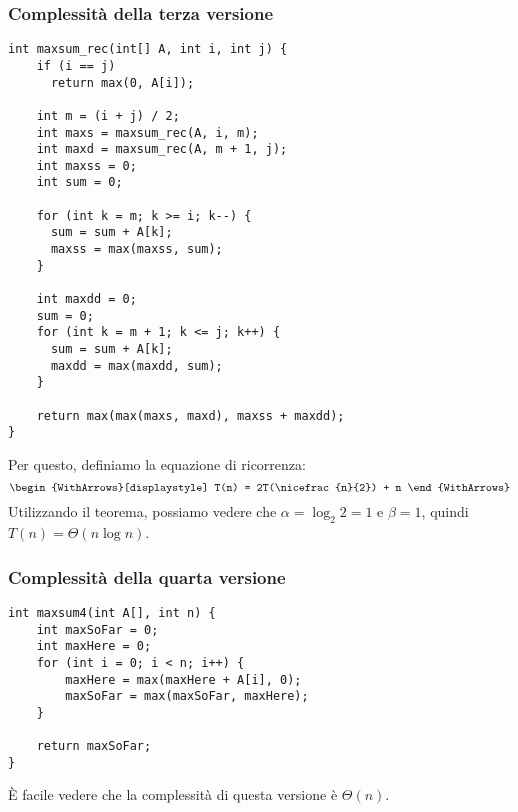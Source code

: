 \subsubsection*{Complessità della terza versione}

\begin{code}
\begin{verbatim}
int maxsum_rec(int[] A, int i, int j) {
    if (i == j)
      return max(0, A[i]);

    int m = (i + j) / 2;
    int maxs = maxsum_rec(A, i, m);
    int maxd = maxsum_rec(A, m + 1, j);
    int maxss = 0;
    int sum = 0;

    for (int k = m; k >= i; k--) {
      sum = sum + A[k];
      maxss = max(maxss, sum);
    }

	int maxdd = 0;
    sum = 0;
    for (int k = m + 1; k <= j; k++) {
      sum = sum + A[k];
      maxdd = max(maxdd, sum);
    }

    return max(max(maxs, maxd), maxss + maxdd);
}
\end{verbatim}
\end{code}

Per questo, definiamo la equazione di ricorrenza:
\[\begin{WithArrows}[displaystyle]
T(n) = 2T(\nicefrac{n}{2}) + n
\end{WithArrows}\]
Utilizzando il teorema, possiamo vedere che \(\alpha = \log_2 2 = 1\) e \(\beta = 1\), quindi \(T(n) = \Theta(n \log n)\).

\subsubsection*{Complessità della quarta versione}

\begin{code}
\begin{verbatim}
int maxsum4(int A[], int n) {
	int maxSoFar = 0;
	int maxHere = 0;
	for (int i = 0; i < n; i++) {
		maxHere = max(maxHere + A[i], 0);
		maxSoFar = max(maxSoFar, maxHere);
	}

	return maxSoFar;
}
\end{verbatim}
\end{code}

\`{E} facile vedere che la complessità di questa versione è \(\Theta(n)\).

\ifsubfile

\fi
